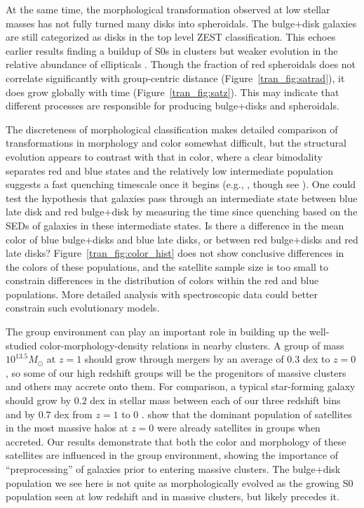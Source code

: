 At the same time, the morphological transformation observed at low
stellar masses has not fully turned many disks into spheroidals. The
bulge+disk galaxies are still categorized as disks in the top level
ZEST classification.  This echoes earlier results finding a buildup of
S0s in clusters but weaker evolution in the relative abundance of
ellipticals \citep[e.g.,][]{Dressler1997}. Though the fraction of red
spheroidals does not correlate significantly with group-centric
distance (Figure~\ref{tran_fig:satrad}), it does grow globally with time
(Figure~\ref{tran_fig:satz}). This may indicate that different processes
are responsible for producing bulge+disks and spheroidals. 

The discreteness of morphological classification makes detailed
comparison of transformations in morphology and color somewhat
difficult, but the structural evolution appears to contrast with that
in color, where a clear bimodality separates red and blue states and
the relatively low intermediate population suggests a fast quenching
timescale once it begins (e.g., \citealt{Wetzel2012a}, though see
\citealt{Balogh2011}). One could test the hypothesis that galaxies pass through an
intermediate state between blue late disk and red bulge+disk by
measuring the time since quenching based on the SEDs of galaxies in
these intermediate states. Is there a difference in the mean color of
blue bulge+disks and blue late disks, or between red bulge+disks and
red late disks? Figure~\ref{tran_fig:color_hist} does not show conclusive
differences in the colors of these populations, and the satellite
sample size is too small to constrain differences in the distribution
of colors within the red and blue populations. More detailed analysis
with spectroscopic data could better constrain such evolutionary
models.

The group environment can play an important role in building up the
well-studied color-morphology-density relations in nearby clusters. A
group of mass $10^{13.5} M_{\odot}$ at $z=1$ should grow through
mergers by an average of $0.3$ dex to $z=0$ \citep{Fakhouri2010}, so
some of our high redshift groups will be the progenitors of massive
clusters and others may accrete onto them. For comparison, a typical
star-forming galaxy should grow by $0.2$ dex in stellar mass between
each of our three redshift bins and by $0.7$ dex from $z=1$ to $0$
\citep{Elbaz2011}.  \citet{Wetzel2012b} show that the dominant
population of satellites in the most massive halos at $z=0$ were
already satellites in groups when accreted. Our results demonstrate
that both the color and morphology of these satellites are influenced
in the group environment, showing the importance of ``preprocessing''
of galaxies prior to entering massive clusters. The bulge+disk
population we see here is not quite as morphologically evolved as the
growing S0 population seen at low redshift and in massive clusters,
but likely precedes it.
 
